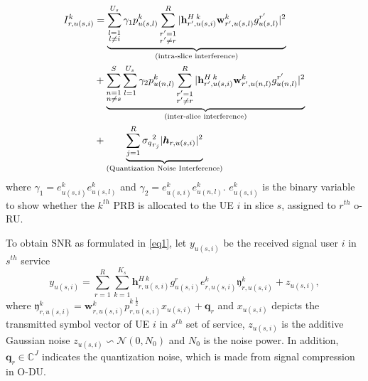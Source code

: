 \documentclass[conference]{IEEEtran}
\begin{document}
\begin{equation}\label{eqI}
\begin{split}
I_{r,u(s,i)}^{k} &=
 \underbrace{\sum_{\substack{l=1 \\ l\neq i}}^{{U}_{s}} \gamma_{1}  p_{u(s,l)}^{k}\sum_{\substack{r'=1 \\ r'\neq r}}^{R}|{\bold{h}_{r',u(s,i)}^{H \: k}} \bold{w}_{r',u(s,l)}^{k} g_{u(s,l)}^{r'}|^2}_{\text{(intra-slice interference)}}\\
&+ \underbrace{\sum_{\substack{n = 1 \\ n\neq s}}^{S}\sum_{l=1}^{{U}_s} \gamma_{2}  p_{u(n,l)}^{k}\sum_{\substack{r'=1 \\ r'\neq r}}^{R}|{\bold{h}_{r',u(s,i)}^{H \: k}} \bold{w}_{r',u(n,l)}^{k} g_{u(n,l)}^{r'}|^2}_{\text{(inter-slice interference)}}\\
&+\underbrace{  \sum_{j=1}^{{R}} {\sigma_q}_{r_j}^2 |\boldsymbol{h}_{r,{u(s,i)}}|^2 }_{\text{(Quantization Noise Interference)}}
\end{split}
\end{equation}
where $\gamma_{1} = e^{k}_{u(s,i)}e^{k}_{u(s,l)}$ and $\gamma_{2} = e^{k}_{u(s,i)}e^{k}_{u(n,l)}$.\newline
$e^{k}_{u(s,i)}$ is the binary variable to show whether the $k^{th}$ PRB is allocated to the UE $i$ in slice $s$, assigned to $r^{th}$ o-RU.

To obtain SNR as formulated in \eqref{eq1}, let $y_{u(s,i)} $ be the received signal user $i$ in $s^{th}$ service
\begin{equation}\label{eq2}
\textstyle y_{u(s,i)} = \sum_{r = 1}^{R}\sum_{k=1}^{K_s} \boldsymbol{h}^{H \: k}_{r,u(s,i)} g_{u(s,i)}^r e^k_{r,u(s,i)}\mathfrak{y}^k_{r,u(s,i)}+ z_{u(s,i)},
\end{equation}
where $\mathfrak{y}^k_{r,u(s,i)} =\boldsymbol{w}^k_{r,u(s,i)}{p^{k \: \frac{1}{2}}_{r,u(s,i)}} x_{u(s,i)}+ \boldsymbol{q}_{r}$
and $ x_{u(s,i)}$ depicts the transmitted symbol vector of UE $i$ in $s^{th}$ set of service,  $z_{u(s,i)}$ is the additive Gaussian noise $z_{u(s,i)} \backsim \mathcal{N}(0,N_0)$ and $N_0$ is the noise power.
In addition, $\boldsymbol{q}_{r} \in \mathbb{C}^{J }  $ indicates the quantization noise, which is made from signal compression in O-DU.
\end{document}
